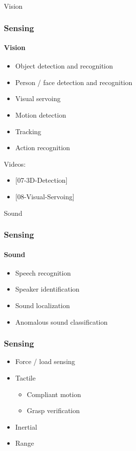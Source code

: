 \documentclass{beamer}
\begin{document}
\begin{frame}[standout]
     Vision
\end{frame}
\begin{frame}
\frametitle{Sensing}
\framesubtitle{Vision}
\begin{itemize}
    \item <1->Object detection and recognition
    \item <2->Person / face detection and recognition
    \item <3->Visual servoing
    \item <4->Motion detection
    \item <5->Tracking
    \item <6->Action recognition
\end{itemize}

{\footnotesize
Videos:
\begin{itemize}
\item <1->{[07-3D-Detection]}
\item <3->{[08-Visual-Servoing]}
\end{itemize}}
\end{frame}

\begin{frame}[standout]
     Sound
\end{frame}
\begin{frame}
\frametitle{Sensing}
\framesubtitle{Sound}
\begin{itemize}
    \item <1->Speech recognition
    \item <2->Speaker identification
    \item <3->Sound localization
    \item <4->Anomalous sound classification
\end{itemize}
\end{frame}

\begin{frame}
\frametitle{Sensing}
\begin{itemize}
    \item <1->Force / load sensing
    \item <2->Tactile
        \begin{itemize}
            \item Compliant motion
            \item Grasp verification
        \end{itemize}
    \item <3->Inertial
    \item <4->Range
\end{itemize}
\end{frame}
\end{document}
